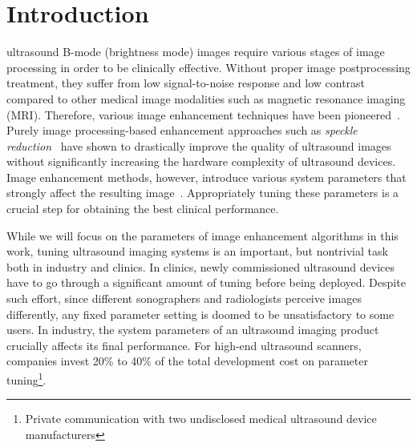 
\section{Introduction}\label{section:introduction}
 ultrasound B-mode (brightness mode) images require various stages of image processing in order to be clinically effective.
Without proper image postprocessing treatment, they suffer from low signal-to-noise response and low contrast compared to other medical image modalities such as magnetic resonance imaging (MRI).
Therefore, various image enhancement techniques have been pioneered~\cite{contrerasortiz_ultrasound_2012}.
%
Purely image processing-based enhancement approaches such as \textit{speckle reduction}~\cite{finn_echocardiographic_2011, duarte-salazar_speckle_2020} have shown to drastically improve the quality of ultrasound images without significantly increasing the hardware complexity of ultrasound devices. 
Image enhancement methods, however, introduce various system parameters that strongly affect the resulting image~\cite{duarte-salazar_speckle_2020}.
Appropriately tuning these parameters is a crucial step for obtaining the best clinical performance.%

While we will focus on the parameters of image enhancement algorithms in this work, tuning ultrasound imaging systems is an important, but nontrivial task both in industry and clinics.
In clinics, newly commissioned ultrasound devices have to go through a significant amount of tuning before being deployed.
Despite such effort, since different sonographers and radiologists perceive images differently, any fixed parameter setting is doomed to be unsatisfactory to some users.
In industry, the system parameters of an ultrasound imaging product crucially affects its final performance.
For high-end ultrasound scanners, companies invest 20\% to 40\% of the total development cost on parameter tuning\footnote{Private communication with two undisclosed medical ultrasound device manufacturers}.

